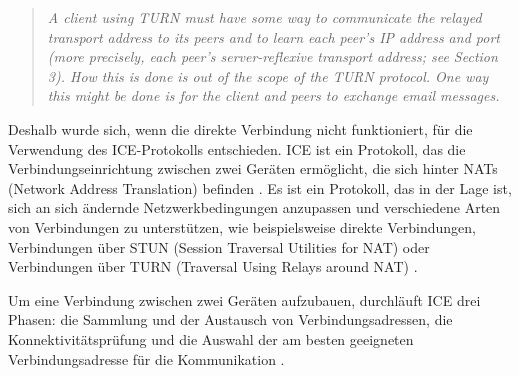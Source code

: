 \begin{quote}
    \textit{A client using TURN must have some way to communicate the relayed transport address to its
    peers and to learn each peer's IP address and port (more precisely, each peer's server-reflexive
    transport address; see Section 3). How this is done is out of the scope of the TURN protocol. One
    way this might be done is for the client and peers to exchange email messages.} \parencite[S. 7]{rfc8656_TURN}
\end{quote}


\noindent Deshalb wurde sich, wenn die direkte Verbindung nicht funktioniert, für die Verwendung des ICE-Protokolls entschieden. ICE ist ein Protokoll, das die Verbindungseinrichtung zwischen zwei Geräten ermöglicht, die sich hinter NATs (Network Address Translation) befinden \parencite[S. 6 ff.]{rfc8445_ICE}. Es ist ein Protokoll, das in der Lage ist, sich an sich ändernde Netzwerkbedingungen anzupassen und verschiedene Arten von Verbindungen zu unterstützen, wie beispielsweise direkte Verbindungen, Verbindungen über STUN (Session Traversal Utilities for NAT) oder Verbindungen über TURN (Traversal Using Relays around NAT) \parencite[S. 1]{rfc8445_ICE}. 

Um eine Verbindung zwischen zwei Geräten aufzubauen, durchläuft ICE drei Phasen: die Sammlung und der Austausch von Verbindungsadressen, die Konnektivitätsprüfung und die Auswahl der am besten geeigneten Verbindungsadresse für die Kommunikation \parencite[S. 7 ff.]{rfc8445_ICE}.

